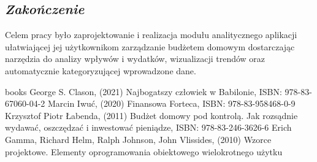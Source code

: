 \documentclass[a4paper,10pt, twoside]{report}
\newcommand{\customstylechapter}[1]{\large{\textit{#1}}}
\begin{document}
\begin{large}
\chapter{\customstylechapter{Zakończenie}}
{Celem pracy było zaprojektowanie i realizacja modułu analitycznego aplikacji 
ułatwiającej jej użytkownikom zarządzanie budżetem domowym dostarczając 
narzędzia do analizy wpływów i wydatków, wizualizacji trendów oraz automatycznie 
kategoryzującej wprowadzone dane.}



\begin{thebibliography} {books}
     George S. Clason, (2021) Najbogatszy człowiek w Babilonie, ISBN: 978-83-67060-04-2
     Marcin Iwuć, (2020) Finansowa Forteca, ISBN: 978-83-958468-0-9
     Krzysztof Piotr Łabenda, (2011) Budżet domowy pod kontrolą. Jak rozsądnie wydawać, oszczędzać i inwestować pieniądze, ISBN: 978-83-246-3626-6
     Erich Gamma, Richard Helm, Ralph Johnson, John Vlissides, (2010) Wzorce projektowe. Elementy oprogramowania obiektowego wielokrotnego użytku 


\end{thebibliography}
\end{large}
\end{document}

